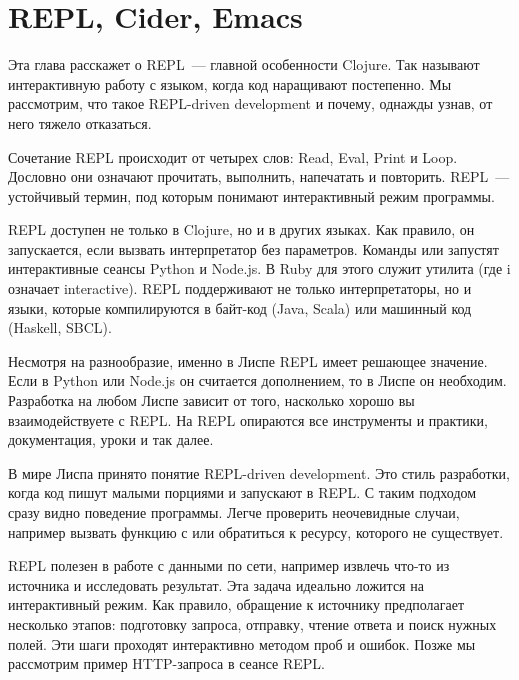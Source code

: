 \chapter{REPL, Cider, Emacs}

\begin{teaser}
Эта глава расскажет о REPL~--- главной особенности Clojure. Так называют интерактивную работу с языком, когда код наращивают постепенно. Мы рассмотрим, что такое REPL-driven development и почему, однажды узнав, от него тяжело отказаться.
\end{teaser}


Сочетание REPL происходит от четырех слов: Read, Eval, Print и Loop. Дословно они означают прочитать, выполнить, напечатать и повторить. REPL~--- устойчивый термин, под которым понимают интерактивный режим программы.


REPL доступен не только в Clojure, но и в других языках. Как правило, он запускается, если вызвать интерпретатор без параметров. Команды  или  запустят интерактивные сеансы Python и Node.js. В Ruby для этого служит утилита  (где i означает interactive). REPL поддерживают не только интерпретаторы, но и языки, которые компилируются в байт-код (Java, Scala) или машинный код (Haskell, SBCL).

Несмотря на разнообразие, именно в Лиспе REPL имеет решающее значение. Если в Python или Node.js он считается дополнением, то в Лиспе он необходим. Разработка на любом Лиспе зависит от того, насколько хорошо вы взаимодействуете с REPL. На REPL опираются все инструменты и практики, документация, уроки и так далее.

В мире Лиспа принято понятие REPL-driven development. Это стиль разработки, когда код пишут малыми порциями и запускают в REPL. С таким подходом сразу видно поведение программы. Легче проверить неочевидные случаи, например вызвать функцию с  или обратиться к ресурсу, которого не существует.

REPL полезен в работе с данными по сети, например извлечь что-то из источника и исследовать результат. Эта задача идеально ложится на интерактивный режим. Как правило, обращение к источнику предполагает несколько этапов: подготовку запроса, отправку, чтение ответа и поиск нужных полей. Эти шаги проходят интерактивно методом проб и ошибок. Позже мы рассмотрим пример HTTP-запроса в сеансе REPL.

